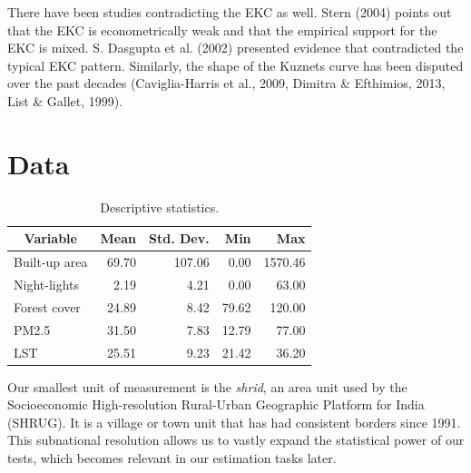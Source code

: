 \documentclass{article}
\begin{document}
There have been studies contradicting the EKC as well. Stern (2004) points out that the EKC is econometrically weak and that the empirical support for the EKC is mixed. S. Dasgupta et al. (2002) presented evidence that contradicted the typical EKC pattern. Similarly, the shape of the Kuznets curve has been disputed over the past decades (Caviglia-Harris et al., 2009, Dimitra \& Efthimios, 2013, List \& Gallet, 1999). 


\section{Data}

\begin{table}[b]
    \centering
    \begin{tabular}{|l|r|r|r|r|}
    \hline
    \multicolumn{1}{|c|}{\textbf{Variable}} & \multicolumn{1}{c|}{\textbf{Mean}} & \multicolumn{1}{c|}{\textbf{Std. Dev.}} & \textbf{Min} & \textbf{Max} \\ \hline
    Built-up area                           & 69.70                             & 107.06                                  & 0.00            & 1570.46      \\ \hline
    Night-lights                            & 2.19                              & 4.21                                   & 0.00            & 63.00           \\ \hline
    Forest cover                            & 24.89                              & 8.42                                    & 79.62        & 120.00          \\ \hline
    PM2.5                                   & 31.50                              & 7.83                                    & 12.79        & 77.00           \\ \hline
    LST                                     & 25.51                             & 9.23                                   & 21.42       & 36.20       \\ \hline
    \end{tabular}
    \caption{Descriptive statistics.}
\end{table}


Our smallest unit of measurement is the \textit{shrid}, an area unit used by the Socioeconomic High-resolution Rural-Urban Geographic Platform for India (SHRUG). It is a village or town unit that has had consistent borders since 1991. This subnational resolution allows us to vastly expand the  statistical power of our tests, which becomes relevant in our estimation tasks later.
\end{document}
